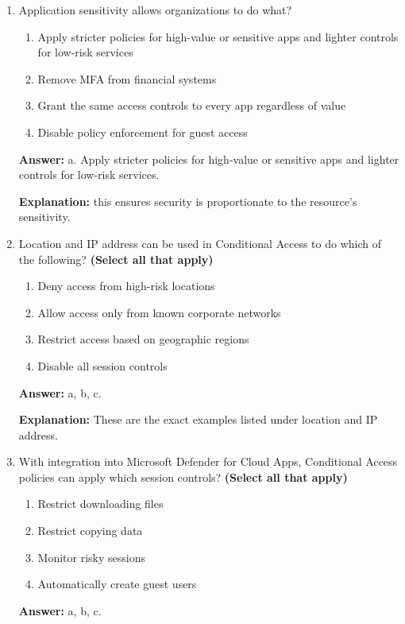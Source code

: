 \documentclass[10pt]{article}
\begin{document}
\begin{enumerate}[leftmargin=*]
\textbf{Explanation:} These are the examples given for device compliance and state.

\item Application sensitivity allows organizations to do what?
\begin{enumerate}[label=\alph*., leftmargin=1.5em]
\item Apply stricter policies for high-value or sensitive apps and lighter controls for low-risk services
\item Remove MFA from financial systems
\item Grant the same access controls to every app regardless of value
\item Disable policy enforcement for guest access
\end{enumerate}
\textbf{Answer:} a. Apply stricter policies for high-value or sensitive apps and lighter controls for low-risk services.

\textbf{Explanation:} this ensures security is proportionate to the resource’s sensitivity.

\item Location and IP address can be used in Conditional Access to do which of the following? \textbf{(Select all that apply)}
\begin{enumerate}[label=\alph*., leftmargin=1.5em]
\item Deny access from high-risk locations
\item Allow access only from known corporate networks
\item Restrict access based on geographic regions
\item Disable all session controls
\end{enumerate}
\textbf{Answer:} a, b, c.

\textbf{Explanation:} These are the exact examples listed under location and IP address.

\item With integration into Microsoft Defender for Cloud Apps, Conditional Access policies can apply which session controls? \textbf{(Select all that apply)}
\begin{enumerate}[label=\alph*., leftmargin=1.5em]
\item Restrict downloading files
\item Restrict copying data
\item Monitor risky sessions
\item Automatically create guest users
\end{enumerate}
\textbf{Answer:} a, b, c.


\end{enumerate}
\end{document}

